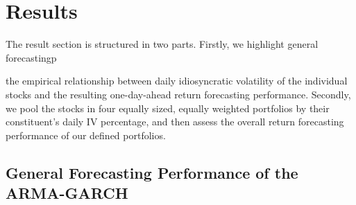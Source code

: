 \chapter{Results}
\label{Results}
The result section is structured in two parts. Firstly, we highlight general forecastingp

the empirical relationship between daily idiosyncratic volatility of the individual stocks and the resulting one-day-ahead return forecasting performance. Secondly, we pool the stocks in four equally sized, equally weighted portfolios by their constituent's daily IV percentage, and then assess the overall return forecasting performance of our defined portfolios.

\section{General Forecasting Performance of the ARMA-GARCH}

